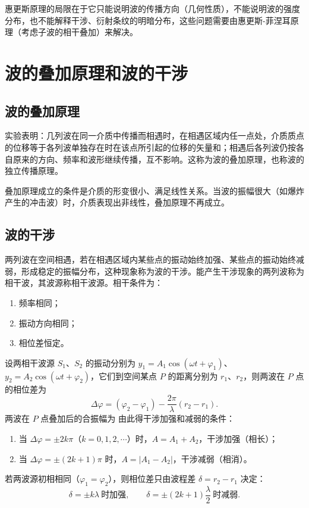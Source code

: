     惠更斯原理的局限在于它只能说明波的传播方向（几何性质），不能说明波的强度分布，也不能解释干涉、衍射条纹的明暗分布，这些问题需要由惠更斯-菲涅耳原理（考虑子波的相干叠加）来解决。


\section{波的叠加原理和波的干涉}
    \subsection{波的叠加原理}
    实验表明：几列波在同一介质中传播而相遇时，在相遇区域内任一点处，介质质点的位移等于各列波单独存在时在该点所引起的位移的矢量和；相遇后各列波仍按各自原来的方向、频率和波形继续传播，互不影响。这称为波的叠加原理，也称波的独立传播原理。

    叠加原理成立的条件是介质的形变很小、满足线性关系。当波的振幅很大（如爆炸产生的冲击波）时，介质表现出非线性，叠加原理不再成立。

    \subsection{波的干涉}
    两列波在空间相遇，若在相遇区域内某些点的振动始终加强、某些点的振动始终减弱，形成稳定的振幅分布，这种现象称为波的干涉。能产生干涉现象的两列波称为相干波，其波源称相干波源。相干条件为：
    \begin{enumerate}
        \item 频率相同；
        \item 振动方向相同；
        \item 相位差恒定。
    \end{enumerate}

    设两相干波源 $S_1$、$S_2$ 的振动分别为 $y_1=A_1\cos(\omega t+\varphi_1)$、$y_2=A_2\cos(\omega t+\varphi_2)$，它们到空间某点 $P$ 的距离分别为 $r_1$、$r_2$，则两波在 $P$ 点的相位差为
    \[
    \Delta\varphi=(\varphi_2-\varphi_1)-\frac{2\pi}{\lambda}(r_2-r_1).
    \]
    两波在 $P$ 点叠加后的合振幅为
    由此得干涉加强和减弱的条件：
    \begin{enumerate}
        \item 当 $\Delta\varphi=\pm2k\pi$（$k=0,1,2,\cdots$）时，$A=A_1+A_2$，干涉加强（相长）；
        \item 当 $\Delta\varphi=\pm(2k+1)\pi$ 时，$A=|A_1-A_2|$，干涉减弱（相消）。
    \end{enumerate}
    若两波源初相相同（$\varphi_1=\varphi_2$），则相位差只由波程差 $\delta=r_2-r_1$ 决定：
    \[
    \delta=\pm k\lambda\ \text{时加强},\qquad
    \delta=\pm(2k+1)\frac{\lambda}{2}\ \text{时减弱}.
    \]


